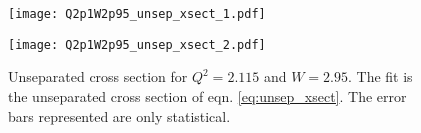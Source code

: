 \begin{figure}
  \centering
  \begin{minipage}[b]{0.48\linewidth}
    \texttt{[image: Q2p1W2p95\_unsep\_xsect\_1.pdf]}
  \end{minipage}
  \hfill
  \begin{minipage}[b]{0.48\linewidth}
    \texttt{[image: Q2p1W2p95\_unsep\_xsect\_2.pdf]}
  \end{minipage}  
  \caption{Unseparated cross section for $Q^2=2.115$ and $W=2.95$. The fit is the unseparated cross section of eqn. \ref{eq:unsep_xsect}. The error bars represented are only statistical.}
  \label{fig:Q2p1W2p95_unsep_xsect}
\end{figure}

